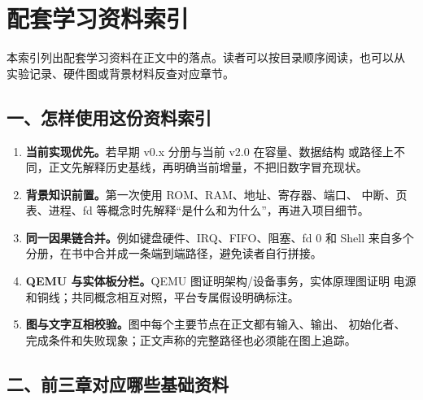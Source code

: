\chapter*{配套学习资料索引}

本索引列出配套学习资料在正文中的落点。读者可以按目录顺序阅读，也可以从
实验记录、硬件图或背景材料反查对应章节。

\newcommand{\learningpathii}[2]{%
  \shortstack[l]{\scriptsize\filepath{#1}\\[-0.15em]\scriptsize\filepath{#2}}}
\newcommand{\learningpathiii}[3]{%
  \shortstack[l]{\scriptsize\filepath{#1}\\[-0.15em]\scriptsize\filepath{#2}\\[-0.15em]
  \scriptsize\filepath{#3}}}

\section*{一、怎样使用这份资料索引}

\begin{enumerate}[leftmargin=2.2em]
  \item \textbf{当前实现优先。}若早期 v0.x 分册与当前 v2.0 在容量、数据结构
        或路径上不同，正文先解释历史基线，再明确当前增量，不把旧数字冒充现状。
  \item \textbf{背景知识前置。}第一次使用 ROM、RAM、地址、寄存器、端口、
        中断、页表、进程、fd 等概念时先解释“是什么和为什么”，再进入项目细节。
  \item \textbf{同一因果链合并。}例如键盘硬件、IRQ、FIFO、阻塞、fd 0 和 Shell
        来自多个分册，在书中合并成一条端到端路径，避免读者自行拼接。
  \item \textbf{QEMU 与实体板分栏。}QEMU 图证明架构/设备事务，实体原理图证明
        电源和铜线；共同概念相互对照，平台专属假设明确标注。
  \item \textbf{图与文字互相校验。}图中每个主要节点在正文都有输入、输出、
        初始化者、完成条件和失败现象；正文声称的完整路径也必须能在图上追踪。
\end{enumerate}

\section*{二、前三章对应哪些基础资料}


